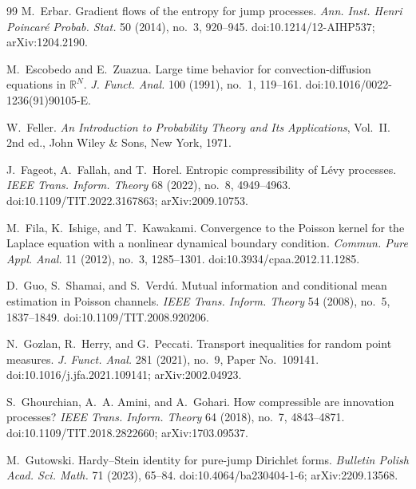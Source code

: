 \documentclass[11pt,reqno]{amsart}
\theoremstyle{plain}
\theoremstyle{definition}
\numberwithin{equation}{section}
\begin{document}
\begin{thebibliography}{99}
M.~Erbar.
\newblock Gradient flows of the entropy for jump processes.
\newblock \emph{Ann. Inst. Henri Poincar{\'e} Probab. Stat.} 50 (2014),
no.~3, 920--945.
\newblock doi:10.1214/12-AIHP537; arXiv:1204.2190.

M.~Escobedo and E.~Zuazua.
\newblock Large time behavior for convection-diffusion equations in
{$\mathbb R^N$}.
\newblock \emph{J. Funct. Anal.} 100 (1991), no.~1, 119--161.
\newblock doi:10.1016/0022-1236(91)90105-E.

W.~Feller.
\newblock \emph{An Introduction to Probability Theory and Its Applications},
Vol.~II.
\newblock 2nd ed., John Wiley \& Sons, New York, 1971.

J.~Fageot, A.~Fallah, and T.~Horel.
\newblock Entropic compressibility of L{\'e}vy processes.
\newblock \emph{IEEE Trans. Inform. Theory} 68 (2022), no.~8, 4949--4963.
\newblock doi:10.1109/TIT.2022.3167863; arXiv:2009.10753.

M.~Fila, K.~Ishige, and T.~Kawakami.
\newblock Convergence to the Poisson kernel for the Laplace equation with a
nonlinear dynamical boundary condition.
\newblock \emph{Commun. Pure Appl. Anal.} 11 (2012), no.~3, 1285--1301.
\newblock doi:10.3934/cpaa.2012.11.1285.

D.~Guo, S.~Shamai, and S.~Verd{\'u}.
\newblock Mutual information and conditional mean estimation in Poisson
channels.
\newblock \emph{IEEE Trans. Inform. Theory} 54 (2008), no.~5, 1837--1849.
\newblock doi:10.1109/TIT.2008.920206.

N.~Gozlan, R.~Herry, and G.~Peccati.
\newblock Transport inequalities for random point measures.
\newblock \emph{J. Funct. Anal.} 281 (2021), no.~9, Paper No.~109141.
\newblock doi:10.1016/j.jfa.2021.109141; arXiv:2002.04923.

S.~Ghourchian, A.~A. Amini, and A.~Gohari.
\newblock How compressible are innovation processes?
\newblock \emph{IEEE Trans. Inform. Theory} 64 (2018), no.~7, 4843--4871.
\newblock doi:10.1109/TIT.2018.2822660; arXiv:1703.09537.

M.~Gutowski.
\newblock Hardy--Stein identity for pure-jump Dirichlet forms.
\newblock \emph{Bulletin Polish Acad. Sci. Math.} 71 (2023), 65--84.
\newblock doi:10.4064/ba230404-1-6; arXiv:2209.13568.


\end{thebibliography}
\end{document}
